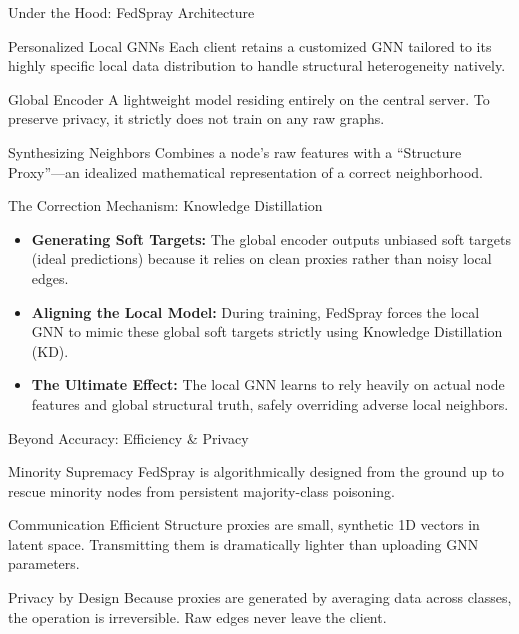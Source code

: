 \documentclass[11pt, aspectratio=169]{beamer}
\begin{document}
\begin{frame}{Under the Hood: FedSpray Architecture}
    \begin{block}{Personalized Local GNNs}
        Each client retains a customized GNN tailored to its highly specific local data distribution to handle structural heterogeneity natively.
    \end{block}
    
    \begin{block}{Global Encoder}
        A lightweight model residing entirely on the central server. To preserve privacy, it strictly does not train on any raw graphs.
    \end{block}
    
    \begin{block}{Synthesizing Neighbors}
        Combines a node's raw features with a ``Structure Proxy''---an idealized mathematical representation of a correct neighborhood.
    \end{block}
\end{frame}

\begin{frame}{The Correction Mechanism: Knowledge Distillation}
    \begin{itemize}
        \item \textbf{Generating Soft Targets:} The global encoder outputs unbiased soft targets (ideal predictions) because it relies on clean proxies rather than noisy local edges.
        \vspace{0.4cm}
        \item \textbf{Aligning the Local Model:} During training, FedSpray forces the local GNN to mimic these global soft targets strictly using Knowledge Distillation (KD).
        \vspace{0.4cm}
        \item \textbf{The Ultimate Effect:} The local GNN learns to rely heavily on actual node features and global structural truth, safely overriding adverse local neighbors.
    \end{itemize}
\end{frame}

\begin{frame}{Beyond Accuracy: Efficiency \& Privacy}
    \begin{block}{Minority Supremacy}
        FedSpray is algorithmically designed from the ground up to rescue minority nodes from persistent majority-class poisoning.
    \end{block}
    
    \begin{block}{Communication Efficient}
        Structure proxies are small, synthetic 1D vectors in latent space. Transmitting them is dramatically lighter than uploading GNN parameters.
    \end{block}
    
    \begin{block}{Privacy by Design}
        Because proxies are generated by averaging data across classes, the operation is irreversible. Raw edges never leave the client.
    \end{block}
\end{frame}
\end{document}
